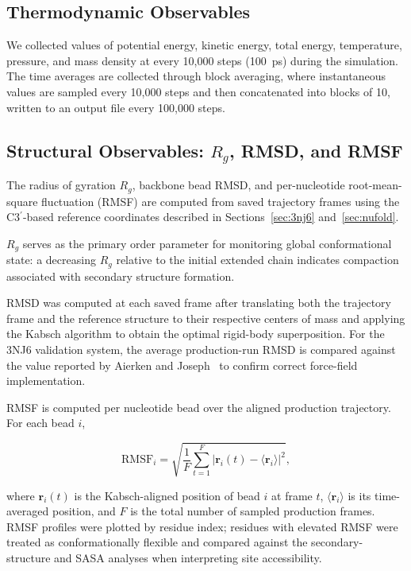 \subsection{Thermodynamic Observables}


We collected values of potential energy, kinetic energy, total energy, temperature, pressure, and mass density at every 10,000 steps (100~ps) during the simulation. 
The time averages are collected through block averaging, where instantaneous values are sampled every 10,000 steps and then concatenated into blocks of 10, written to an output file every 100,000 steps.


\subsection{Structural Observables: $R_g$, RMSD, and RMSF}
\label{sec:structural_obs}

The radius of gyration $R_g$, backbone bead RMSD, and per-nucleotide
root-mean-square fluctuation (RMSF) are computed from saved trajectory
frames using the C3$^\prime$-based reference coordinates described in
Sections~\ref{sec:3nj6} and~\ref{sec:nufold}.

$R_g$ serves as the primary order parameter for monitoring global
conformational state: a decreasing $R_g$ relative to the initial
extended chain indicates compaction associated with secondary structure
formation.

RMSD was computed at each saved frame after translating both the
trajectory frame and the reference structure to their respective centers
of mass and applying the Kabsch algorithm to obtain the optimal
rigid-body superposition.
For the 3NJ6 validation system, the average production-run RMSD is
compared against the value reported by Aierken and
Joseph~\cite{Aierken2024} to confirm correct force-field implementation.

RMSF is computed per nucleotide bead over the aligned production
trajectory.
For each bead $i$,

\begin{equation}
  \mathrm{RMSF}_i = \sqrt{\frac{1}{F}\sum_{t=1}^{F}
    \left|\mathbf{r}_i(t) - \langle\mathbf{r}_i\rangle\right|^2},
  \label{eq:rmsf}
\end{equation}

where $\mathbf{r}_i(t)$ is the Kabsch-aligned position of bead $i$ at
frame $t$, $\langle\mathbf{r}_i\rangle$ is its time-averaged position,
and $F$ is the total number of sampled production frames.
RMSF profiles were plotted by residue index; residues with elevated RMSF
were treated as conformationally flexible and compared against the
secondary-structure and SASA analyses when interpreting site
accessibility.



